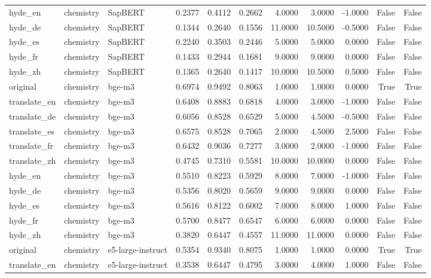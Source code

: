 \begin{tabular}{lllrrrrrrrr}
hyde\_en & chemistry & SapBERT & 0.2377 & 0.4112 & 0.2662 & 4.0000 & 3.0000 & -1.0000 & False & False \\
hyde\_de & chemistry & SapBERT & 0.1344 & 0.2640 & 0.1556 & 11.0000 & 10.5000 & -0.5000 & False & False \\
hyde\_es & chemistry & SapBERT & 0.2240 & 0.3503 & 0.2446 & 5.0000 & 5.0000 & 0.0000 & False & False \\
hyde\_fr & chemistry & SapBERT & 0.1433 & 0.2944 & 0.1681 & 9.0000 & 9.0000 & 0.0000 & False & False \\
hyde\_zh & chemistry & SapBERT & 0.1365 & 0.2640 & 0.1417 & 10.0000 & 10.5000 & 0.5000 & False & False \\
original & chemistry & bge-m3 & 0.6974 & 0.9492 & 0.8063 & 1.0000 & 1.0000 & 0.0000 & True & True \\
translate\_en & chemistry & bge-m3 & 0.6408 & 0.8883 & 0.6818 & 4.0000 & 3.0000 & -1.0000 & False & False \\
translate\_de & chemistry & bge-m3 & 0.6056 & 0.8528 & 0.6529 & 5.0000 & 4.5000 & -0.5000 & False & False \\
translate\_es & chemistry & bge-m3 & 0.6575 & 0.8528 & 0.7065 & 2.0000 & 4.5000 & 2.5000 & False & False \\
translate\_fr & chemistry & bge-m3 & 0.6432 & 0.9036 & 0.7277 & 3.0000 & 2.0000 & -1.0000 & False & False \\
translate\_zh & chemistry & bge-m3 & 0.4745 & 0.7310 & 0.5581 & 10.0000 & 10.0000 & 0.0000 & False & False \\
hyde\_en & chemistry & bge-m3 & 0.5510 & 0.8223 & 0.5929 & 8.0000 & 7.0000 & -1.0000 & False & False \\
hyde\_de & chemistry & bge-m3 & 0.5356 & 0.8020 & 0.5659 & 9.0000 & 9.0000 & 0.0000 & False & False \\
hyde\_es & chemistry & bge-m3 & 0.5616 & 0.8122 & 0.6002 & 7.0000 & 8.0000 & 1.0000 & False & False \\
hyde\_fr & chemistry & bge-m3 & 0.5700 & 0.8477 & 0.6547 & 6.0000 & 6.0000 & 0.0000 & False & False \\
hyde\_zh & chemistry & bge-m3 & 0.3820 & 0.6447 & 0.4557 & 11.0000 & 11.0000 & 0.0000 & False & False \\
original & chemistry & e5-large-instruct & 0.5354 & 0.9340 & 0.8075 & 1.0000 & 1.0000 & 0.0000 & True & True \\
translate\_en & chemistry & e5-large-instruct & 0.3538 & 0.6447 & 0.4795 & 3.0000 & 4.0000 & 1.0000 & False & False \\

\end{tabular}
